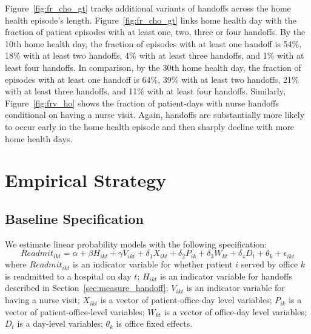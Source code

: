 \documentclass[final,12pt, notitlepage]{article}
\begin{document}
Figure~\ref{fig:fr_cho_gt} tracks additional variants of handoffs across the home health episode's length.
Figure~\ref{fig:fr_cho_gt} links home health day with the fraction of patient episodes with at least one, two, three or four handoffs.
By the 10th home health day, the fraction of episodes with at least one handoff is 54\%, 18\% with at least two handoffs, 4\% with at least  three handoffs, and 1\% with at least four handoffs.
In comparison, by the 30th home health day, the fraction of episodes with at least one handoff is 64\%, 39\% with at least two handoffs, 21\% with at least three handoffs, and 11\% with at least four handoffs.
Similarly, Figure~\ref{fig:frv_ho} shows the fraction of patient-days with nurse handoffs conditional on having a nurse visit.
Again, handoffs are substantially more likely to occur early in the home health episode and then sharply decline with more home health days.



















\section{Empirical Strategy} \label{sec:empr_strategy}

\subsection{Baseline Specification} \label{sec:spec}

We estimate linear probability models with the following specification:
\begin{equation}\label{eq:regeq}
Readmit_{ikt} = \alpha + \beta H_{ikt} + \gamma V_{ikt} + \delta_1 X_{ikt} + \delta_2 P_{ik} + \delta_3 W_{kt} + \delta_4 D_t + \theta_k + \epsilon_{ikt}
\end{equation}
where $Readmit_{ikt}$ is an indicator variable for whether patient $i$ served by office $k$ is readmitted to a hospital on day $t$;
$H_{ikt}$ is an indicator variable for handoffs described in Section~\ref{sec:measure_handoff};
$V_{ikt}$ is an indicator variable for having a nurse visit;
$X_{ikt}$ is a vector of patient-office-day level variables;
$P_{ik}$ is a vector of patient-office-level variables;
$W_{kt}$ is a vector of office-day level variables;
$D_t$ is a day-level variables;
$\theta_k$ is office fixed effects.
\end{document}
